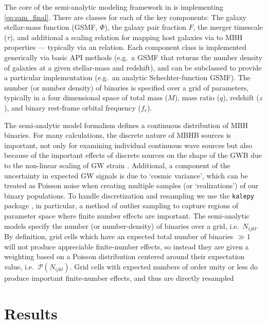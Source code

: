         The core of the semi-analytic modeling framework in \holodeck{} is implementing \eqref{eq:sam_final}.  There are classes for each of the key components: The galaxy stellar-mass function (GSMF, $\Phi$), the galaxy pair fraction \(F\), the merger timescale ($\tau$), and additional a scaling relation for mapping host galaxies via to MBH properties --- typically via an \mmbulge{} relation.  Each component class is implemented generically via basic API methods (e.g.~a GSMF that returns the number density of galaxies at a given stellar-mass and redshift), and can be subclassed to provide a particular implementation (e.g.~an analytic Schechter-function GSMF).  The number (or number density) of binaries is specified over a grid of parameters, typically in a four dimensional space of total mass ($M$), mass ratio ($q$), redshift ($z$), and binary rest-frame orbital frequency ($f_r$).

        The semi-analytic model formalism defines a continuous distribution of MBH binaries.  For many calculations, the discrete nature of MBHB sources is important, not only for examining individual continuous wave sources but also because of the important effects of discrete sources on the shape of the GWB due to the non-linear scaling of GW strain \citep{Sesana+2008}.  Additional, a component of the uncertainty in expected GW signals is due to `cosmic variance', which can be treated as Poisson noise when creating multiple samples (or `realizations') of our binary populations.  To handle discretization and resampling we use the \texttt{kalepy} package \citep{kalepy2021}, in particular, a method of outlier sampling to capture regions of parameter space where finite number effects are important.  The \holodeck{} semi-analytic models specify the number (or number-density) of binaries over a grid, i.e.~$N_{ijkl}$.  By definition, grid cells which have an expected total number of binaries $\gg 1$ will not produce appreciable finite-number effects, so instead they are given a weighting based on a Poisson distribution centered around their expectation value, i.e.~$\mathcal{P}(N_{ijkl})$.  Grid cells with expected numbers of order unity or less do produce important finite-number effects, and thus are directly resampled



\section{Results}
    \label{sec:res}

